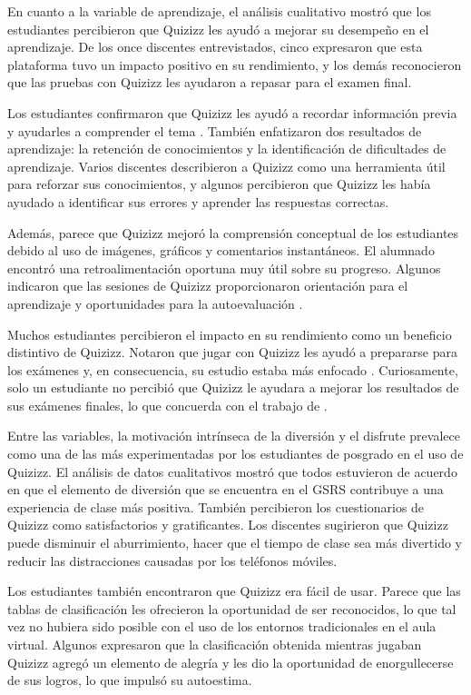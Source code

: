 \documentclass[spanish]{textolivre}
\begin{document}
En cuanto a la variable de aprendizaje, el análisis cualitativo mostró que los estudiantes percibieron que Quizizz les ayudó a mejorar su desempeño en el aprendizaje. De los once discentes entrevistados, cinco expresaron que esta plataforma tuvo un impacto positivo en su rendimiento, y los demás reconocieron que las pruebas con Quizizz les ayudaron a repasar para el examen final.

Los estudiantes confirmaron que Quizizz les ayudó a recordar información previa y ayudarles a comprender el tema \cite{sahak2021, wolff2016}. También enfatizaron dos resultados de aprendizaje: la retención de conocimientos y la identificación de dificultades de aprendizaje. Varios discentes describieron a Quizizz como una herramienta útil para reforzar sus conocimientos, y algunos percibieron que Quizizz les había ayudado a identificar sus errores y aprender las respuestas correctas.

Además, parece que Quizizz mejoró la comprensión conceptual de los estudiantes debido al uso de imágenes, gráficos y comentarios instantáneos. El alumnado encontró una retroalimentación oportuna muy útil sobre su progreso. Algunos indicaron que las sesiones de Quizizz proporcionaron orientación para el aprendizaje y oportunidades para la autoevaluación \cite{dewi2021, mason2021}.

Muchos estudiantes percibieron el impacto en su rendimiento como un beneficio distintivo de Quizizz. Notaron que jugar con Quizizz les ayudó a prepararse para los exámenes y, en consecuencia, su estudio estaba más enfocado \cite{balta2018, mason2021}. Curiosamente, solo un estudiante no percibió que Quizizz le ayudara a mejorar los resultados de sus exámenes finales, lo que concuerda con el trabajo de \cite{vergara_rodriguez2019}.

Entre las variables, la motivación intrínseca de la diversión y el disfrute prevalece como una de las más experimentadas por los estudiantes de posgrado en el uso de Quizizz. El análisis de datos cualitativos mostró que todos estuvieron de acuerdo en que el elemento de diversión que se encuentra en el GSRS contribuye a una experiencia de clase más positiva. También percibieron los cuestionarios de Quizizz como satisfactorios y gratificantes. Los discentes sugirieron que Quizizz puede disminuir el aburrimiento, hacer que el tiempo de clase sea más divertido y reducir las distracciones causadas por los teléfonos móviles.

Los estudiantes también encontraron que Quizizz era fácil de usar. Parece que las tablas de clasificación les ofrecieron la oportunidad de ser reconocidos, lo que tal vez no hubiera sido posible con el uso de los entornos tradicionales en el aula virtual. Algunos expresaron que la clasificación obtenida mientras jugaban Quizizz agregó un elemento de alegría y les dio la oportunidad de enorgullecerse de sus logros, lo que impulsó su autoestima.
\end{document}
